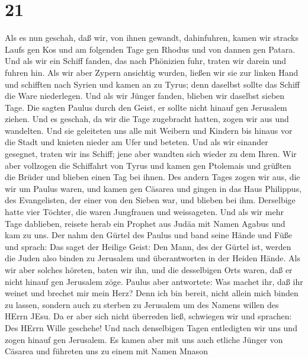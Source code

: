 \hypertarget{section-20}{%
\section{21}\label{section-20}}

 Als es nun geschah, daß wir, von ihnen gewandt,
dahinfuhren, kamen wir stracks Laufs gen Kos und am folgenden Tage gen
Rhodus und von dannen gen Patara.  Und als wir ein Schiff
fanden, das nach Phönizien fuhr, traten wir darein und fuhren hin.
 Als wir aber Zypern ansichtig wurden, ließen wir sie zur
linken Hand und schifften nach Syrien und kamen an zu Tyrus; denn
daselbst sollte das Schiff die Ware niederlegen.  Und als
wir Jünger fanden, blieben wir daselbst sieben Tage. Die sagten Paulus
durch den Geist, er sollte nicht hinauf gen Jerusalem ziehen.
 Und es geschah, da wir die Tage zugebracht hatten, zogen
wir aus und wandelten. Und sie geleiteten uns alle mit Weibern und
Kindern bis hinaus vor die Stadt und knieten nieder am Ufer und beteten.
 Und als wir einander gesegnet, traten wir ins Schiff; jene
aber wandten sich wieder zu dem Ihren.  Wir aber vollzogen
die Schiffahrt von Tyrus und kamen gen Ptolemais und grüßten die Brüder
und blieben einen Tag bei ihnen.  Des andern Tages zogen wir
aus, die wir um Paulus waren, und kamen gen Cäsarea und gingen in das
Haus Philippus, des Evangelisten, der einer von den Sieben war, und
blieben bei ihm.  Derselbige hatte vier Töchter, die waren
Jungfrauen und weissageten.  Und als wir mehr Tage
dablieben, reisete herab ein Prophet aus Judäa mit Namen Agabus und kam
zu uns.  Der nahm den Gürtel des Paulus und band seine
Hände und Füße und sprach: Das saget der Heilige Geist: Den Mann, des
der Gürtel ist, werden die Juden also binden zu Jerusalem und
überantworten in der Heiden Hände.  Als wir aber solches
höreten, baten wir ihn, und die desselbigen Orts waren, daß er nicht
hinauf gen Jerusalem zöge.  Paulus aber antwortete: Was
machet ihr, daß ihr weinet und brechet mir mein Herz? Denn ich bin
bereit, nicht allein mich binden zu lassen, sondern auch zu sterben zu
Jerusalem um des Namens willen des HErrn JEsu.  Da er aber
sich nicht überreden ließ, schwiegen wir und sprachen: Des HErrn Wille
geschehe!  Und nach denselbigen Tagen entledigten wir uns
und zogen hinauf gen Jerusalem.  Es kamen aber mit uns auch
etliche Jünger von Cäsarea und führeten uns zu einem mit Namen Mnason
